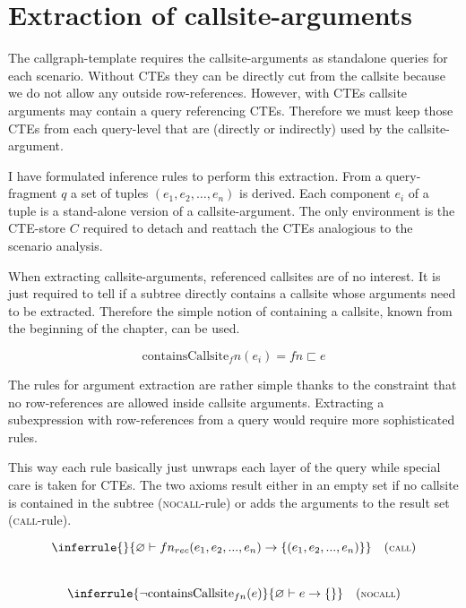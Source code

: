 \section{Extraction of callsite-arguments}

The callgraph-template requires the callsite-arguments as standalone queries for each scenario. Without CTEs they can be directly cut from the callsite because we do not allow any outside row-references. However, with CTEs callsite arguments may contain a query referencing CTEs. Therefore we must keep those CTEs from each query-level that are (directly or indirectly) used by the callsite-argument.

I have formulated inference rules to perform this extraction. From a query-fragment $q$ a set of tuples $(e_1, e_2, \dots, e_n)$ is derived. Each component $e_i$ of a tuple is a stand-alone version of a callsite-argument. The only environment is the CTE-store $C$ required to detach and reattach the CTEs analogious to the scenario analysis.

When extracting callsite-arguments, referenced callsites are of no interest. It is just required to tell if a subtree directly contains a callsite whose arguments need to be extracted. Therefore the simple notion of containing a callsite, known from the beginning of the chapter, can be used.

$$\text{containsCallsite}_fn(e_i) = fn \sqsubset e$$

The rules for argument extraction are rather simple thanks to the constraint that no row-references are allowed inside callsite arguments. Extracting a subexpression with row-references from a query would require more sophisticated rules.

This way each rule basically just unwraps each layer of the query while special care is taken for CTEs. The two axioms result either in an empty set if no callsite is contained in the subtree (\textsc{nocall}-rule) or adds the arguments to the result set (\textsc{call}-rule).

\begin{equation*}
    \inferrule{
}{
    \varnothing \vdash fn_{rec}(e_1, e_2, ..., e_n) \rightarrow \{ (e_1, e_2, ..., e_n) \}
}\quad(\footnotesize\textsc{call})
\end{equation*}
\\
\begin{equation*}
\inferrule{
    \neg \text{containsCallsite}_{fn}(e)
}{  
    \varnothing \vdash e \rightarrow \{\}
}\quad(\footnotesize\textsc{nocall})
\end{equation*}

